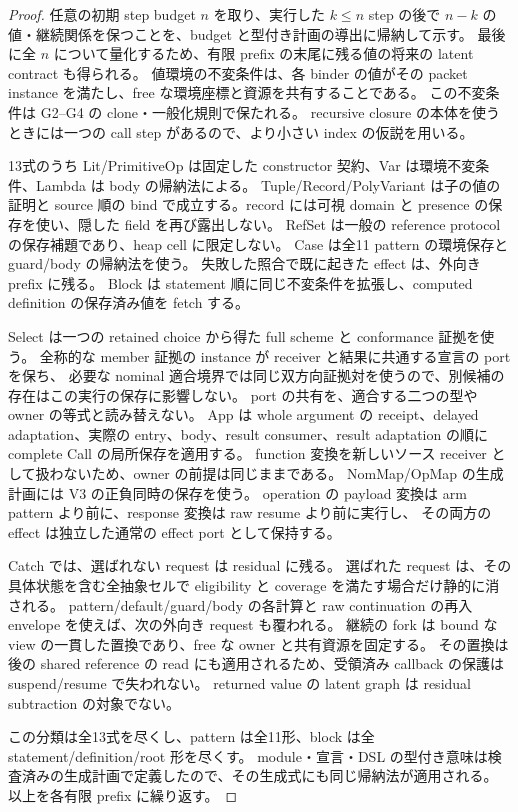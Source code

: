 \documentclass[11pt,a4paper]{article}
\theoremstyle{remark}
\begin{document}
\begin{proof}
任意の初期 step budget \(n\) を取り、実行した \(k\leq n\) step の後で
\(n-k\) の値・継続関係を保つことを、budget と型付き計画の導出に帰納して示す。
最後に全 \(n\) について量化するため、有限 prefix の末尾に残る値の将来の latent contract も得られる。
値環境の不変条件は、各 binder の値がその packet instance を満たし、free な環境座標と資源を共有することである。
この不変条件は G2--G4 の clone・一般化規則で保たれる。
recursive closure の本体を使うときには一つの call step があるので、より小さい index の仮説を用いる。

13式のうち Lit/PrimitiveOp は固定した constructor 契約、Var は環境不変条件、Lambda は body の帰納法による。
Tuple/Record/PolyVariant は子の値の証明と source 順の bind で成立する。record には可視 domain と presence の保存を使い、隠した field を再び露出しない。
RefSet は一般の reference protocol の保存補題であり、heap cell に限定しない。
Case は全11 pattern の環境保存と guard/body の帰納法を使う。
失敗した照合で既に起きた effect は、外向き prefix に残る。
Block は statement 順に同じ不変条件を拡張し、computed definition の保存済み値を fetch する。

Select は一つの retained choice から得た full scheme と conformance 証拠を使う。
全称的な member 証拠の instance が receiver と結果に共通する宣言の port を保ち、
必要な nominal 適合境界では同じ双方向証拠対を使うので、別候補の存在はこの実行の保存に影響しない。
port の共有を、適合する二つの型や owner の等式と読み替えない。
App は whole argument の receipt、delayed adaptation、実際の entry、body、result consumer、result adaptation の順に complete Call の局所保存を適用する。
function 変換を新しいソース receiver として扱わないため、owner の前提は同じままである。
NomMap/OpMap の生成計画には V3 の正負同時の保存を使う。
operation の payload 変換は arm pattern より前に、response 変換は raw resume より前に実行し、
その両方の effect は独立した通常の effect port として保持する。

Catch では、選ばれない request は residual に残る。
選ばれた request は、その具体状態を含む全抽象セルで eligibility と coverage を満たす場合だけ静的に消される。
pattern/default/guard/body の各計算と raw continuation の再入 envelope を使えば、次の外向き request も覆われる。
継続の fork は bound な view の一貫した置換であり、free な owner と共有資源を固定する。
その置換は後の shared reference の read にも適用されるため、受領済み callback の保護は suspend/resume で失われない。
returned value の latent graph は residual subtraction の対象でない。

この分類は全13式を尽くし、pattern は全11形、block は全 statement/definition/root 形を尽くす。
module・宣言・DSL の型付き意味は検査済みの生成計画で定義したので、その生成式にも同じ帰納法が適用される。
以上を各有限 prefix に繰り返す。
\end{proof}
\end{document}
